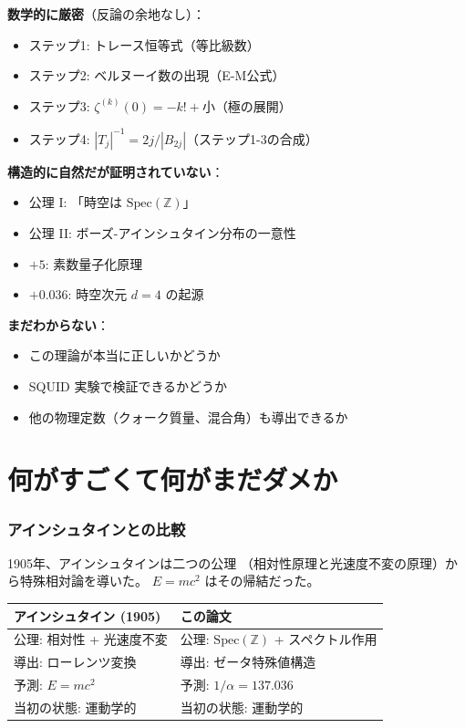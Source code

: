 \documentclass[11pt,a4paper]{article}
\begin{document}
\begin{honestbox}[確信度の階層]
\textbf{数学的に厳密}（反論の余地なし）：
\begin{itemize}
\item ステップ1: トレース恒等式（等比級数）
\item ステップ2: ベルヌーイ数の出現（E-M公式）
\item ステップ3: $\zeta^{(k)}(0) = -k! + \text{小}$（極の展開）
\item ステップ4: $|T_j|^{-1} = 2j/|B_{2j}|$（ステップ1-3の合成）
\end{itemize}

\textbf{構造的に自然だが証明されていない}：
\begin{itemize}
\item 公理 I: 「時空は $\text{Spec}(\mathbb{Z})$」
\item 公理 II: ボーズ-アインシュタイン分布の一意性
\item $+5$: 素数量子化原理
\item $+0.036$: 時空次元 $d = 4$ の起源
\end{itemize}

\textbf{まだわからない}：
\begin{itemize}
\item この理論が本当に正しいかどうか
\item SQUID 実験で検証できるかどうか
\item 他の物理定数（クォーク質量、混合角）も導出できるか
\end{itemize}
\end{honestbox}

\part{何がすごくて何がまだダメか}

\section{アインシュタインとの比較}

1905年、アインシュタインは二つの公理
（相対性原理と光速度不変の原理）から特殊相対論を導いた。
$E = mc^2$ はその帰結だった。

\begin{center}
\renewcommand{\arraystretch}{1.3}
\begin{tabular}{l|l}
\textbf{アインシュタイン (1905)} & \textbf{この論文} \\
\hline
公理: 相対性 + 光速度不変 & 公理: $\text{Spec}(\mathbb{Z})$ + スペクトル作用 \\
導出: ローレンツ変換 & 導出: ゼータ特殊値構造 \\
予測: $E = mc^2$ & 予測: $1/\alpha = 137.036$ \\
当初の状態: 運動学的 & 当初の状態: 運動学的
\end{tabular}
\end{center}
\end{document}
